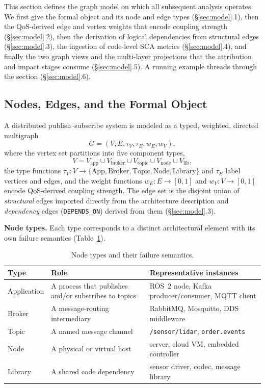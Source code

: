 \documentclass[review]{elsarticle}
\begin{document}
This section defines the graph model on which all subsequent analysis operates. We first give the
formal object and its node and edge types (\S\ref{sec:model}.1), then the QoS-derived edge and
vertex weights that encode coupling strength (\S\ref{sec:model}.2), then the derivation of logical
dependencies from structural edges (\S\ref{sec:model}.3), the ingestion of code-level SCA metrics
(\S\ref{sec:model}.4), and finally the two graph views and the multi-layer projections that the
attribution and impact stages consume (\S\ref{sec:model}.5). A running example threads through the
section (\S\ref{sec:model}.6).

\subsection{Nodes, Edges, and the Formal Object}

A distributed publish--subscribe system is modeled as a typed, weighted, directed multigraph
\begin{equation}
G = (V, E, \tau_V, \tau_E, w_E, w_V),
\end{equation}
where the vertex set partitions into five component types,
\begin{equation}
V = V_{\text{app}} \cup V_{\text{broker}} \cup V_{\text{topic}} \cup V_{\text{node}} \cup V_{\text{lib}},
\end{equation}
the type functions $\tau_V : V \to \{\text{App}, \text{Broker}, \text{Topic}, \text{Node},
\text{Library}\}$ and $\tau_E$ label vertices and edges, and the weight functions $w_E : E \to
[0,1]$ and $w_V : V \to [0,1]$ encode QoS-derived coupling strength. The edge set is the disjoint
union of \emph{structural} edges imported directly from the architecture description and
\emph{dependency} edges (\texttt{DEPENDS\_ON}) derived from them (\S\ref{sec:model}.3).

\textbf{Node types.} Each type corresponds to a distinct architectural element with its own failure
semantics (Table~\ref{tab:nodetypes}).

\begin{table}[h]
\centering
\caption{Node types and their failure semantics.}
\label{tab:nodetypes}
\begin{tabular}{@{}p{2.2cm}p{5cm}p{5cm}@{}}
\toprule
Type & Role & Representative instances \\
\midrule
Application & A process that publishes and/or subscribes to topics & ROS~2 node, Kafka producer/consumer, MQTT client \\
Broker & A message-routing intermediary & RabbitMQ, Mosquitto, DDS middleware \\
Topic & A named message channel & \texttt{/sensor/lidar}, \texttt{order.events} \\
Node & A physical or virtual host & server, cloud VM, embedded controller \\
Library & A shared code dependency & sensor driver, codec, message library \\
\bottomrule
\end{tabular}
\end{table}
\end{document}
